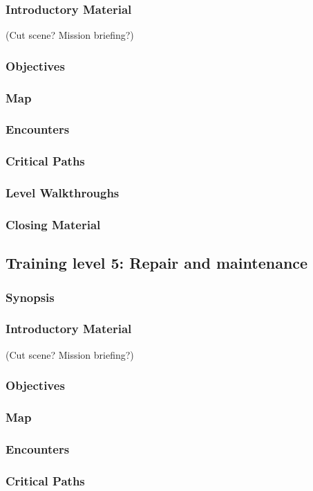 \subsubsection{Introductory Material}
 (Cut scene?  Mission briefing?)
\subsubsection{Objectives}
\subsubsection{Map}
\subsubsection{Encounters}
\subsubsection{Critical Paths}
\subsubsection{Level Walkthroughs}
\subsubsection{Closing Material}

\subsection{Training level 5: Repair and maintenance}
\subsubsection{Synopsis}
\subsubsection{Introductory Material}
 (Cut scene?  Mission briefing?)
\subsubsection{Objectives}
\subsubsection{Map}
\subsubsection{Encounters}
\subsubsection{Critical Paths}

